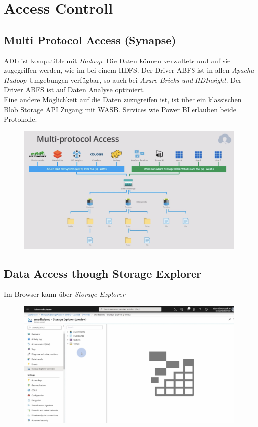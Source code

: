 \section{Access Controll}
\subsection{Multi Protocol Access (Synapse)}
\gls{ADL} ist kompatible mit \textit{Hadoop}. Die Daten können verwaltete und auf sie zugegriffen werden, wie im bei einem \gls{HDFS}. Der Driver \gls{ABFS} ist in allen \textit{Apacha Hadoop} Umgebungen verfügbar, so auch bei \textit{Azure Bricks und HDInsight}. Der Driver \gls{ABFS} ist auf Daten Analyse optimiert.\\

Eine andere Möglichkeit auf die Daten zuzugreifen ist, ist über ein klassischen Blob Storage \gls{API} Zugang mit \gls{WASB}. Services wie Power BI erlauben beide Protokolle.

\begin{figure}[H]
	\centering
	\includegraphics[scale = 0.4]{attachment/chapter_2/Scc111}
\end{figure}


\subsection{Data Access though Storage Explorer}
Im Browser kann über \textit{Storage Explorer}
\begin{figure}[H]
	\centering
	\includegraphics[scale = 0.2]{attachment/chapter_2/Scc116}
\end{figure}

